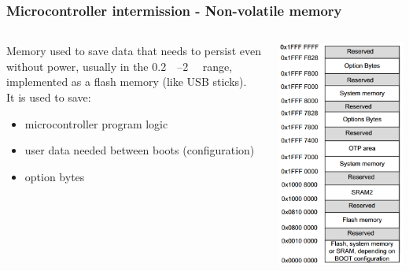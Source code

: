 \documentclass[11pt,xcolor=table,aspectratio=169]{beamer}
\begin{document}
	\begin{frame}
		\frametitle{Microcontroller intermission - Non-volatile memory}
		\begin{columns}
			\begin{column}{.6\textwidth}
				Memory used to save data that needs to persist even without power, usually in the \SIrange{0.2}{2}{\mega\byte} range, implemented as a flash memory (like USB sticks).\\
				It is used to save:
				\begin{itemize}
					\item microcontroller program logic
					\item user data needed between boots (configuration)
					\item option bytes
				\end{itemize}
			\end{column}
			\begin{column}{.3\textwidth}
				\includegraphics[width=.72\textwidth]{media/flash.PNG}
			\end{column}
		\end{columns}
	\end{frame}
	
\end{document}

